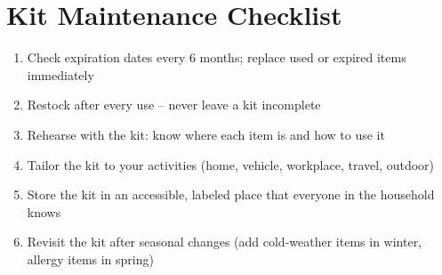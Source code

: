 \section{Kit Maintenance Checklist}

\begin{enumerate}[leftmargin=*]
\item Check expiration dates every 6 months; replace used or expired items immediately
\item Restock after every use -- never leave a kit incomplete
\item Rehearse with the kit: know where each item is and how to use it
\item Tailor the kit to your activities (home, vehicle, workplace, travel, outdoor)
\item Store the kit in an accessible, labeled place that everyone in the household knows
\item Revisit the kit after seasonal changes (add cold-weather items in winter, allergy items in spring)
\end{enumerate}

